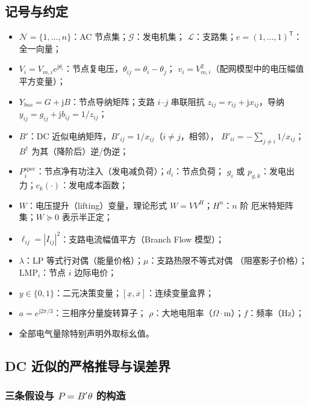 \subsection{记号与约定}
\begin{itemize}
  \item $\mathcal N=\{1,\dots,n\}$：AC 节点集；$\mathcal G$：发电机集；
        $\mathcal L$：支路集；$e=(1,\dots,1)^{\mathsf T}$：全一向量；
  \item $V_i=V_{m,i}e^{\mathrm j\theta_i}$：节点复电压，$\theta_{ij}=\theta_i-\theta_j$；
        $v_i=V_{m,i}^2$（配网模型中的电压幅值平方变量）；
  \item $Y_{bus}=G+\mathrm jB$：节点导纳矩阵；支路 $i$--$j$ 串联阻抗
        $z_{ij}=r_{ij}+\mathrm jx_{ij}$，导纳 $y_{ij}=g_{ij}+\mathrm jb_{ij}=1/z_{ij}$；
  \item $B'$：DC 近似电纳矩阵，$B'_{ij}=1/x_{ij}$（$i\neq j$，相邻），
        $B'_{ii}=-\sum_{j\neq i}1/x_{ij}$；$B^\dagger$ 为其（降阶后）逆/伪逆；
  \item $P_i^{\mathrm{spec}}$：节点净有功注入（发电减负荷）；$d_i$：节点负荷；
        $g_i$ 或 $p_{g,k}$：发电出力；$c_k(\cdot)$：发电成本函数；
  \item $W$：电压提升（lifting）变量，理论形式 $W=VV^{H}$；$H^n$：$n$ 阶
        厄米特矩阵集；$W\succeq0$ 表示半正定；
  \item $\ell_{ij}=|I_{ij}|^2$：支路电流幅值平方（Branch Flow 模型）；
  \item $\lambda$：LP 等式行对偶（能量价格）；$\mu$：支路热限不等式对偶
        （阻塞影子价格）；$\mathrm{LMP}_i$：节点 $i$ 边际电价；
  \item $y\in\{0,1\}$：二元决策变量；$[\underline x,\overline x]$：连续变量盒界；
  \item $a=e^{\mathrm j2\pi/3}$：三相序分量旋转算子；
        $\rho$：大地电阻率（$\Omega\cdot$m）；$f$：频率（Hz）；
  \item 全部电气量除特别声明外取标幺值。
\end{itemize}

\subsection{DC 近似的严格推导与误差界}\label{sec:opf-th-dc-deriv}

\subsubsection{三条假设与 \texorpdfstring{$P=B'\theta$}{P=B'θ} 的构造}

